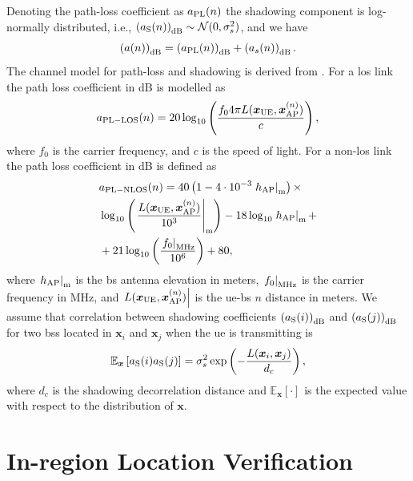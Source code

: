 \documentclass[conference,final]{IEEEtran}
\newcommand{\E}[2]{\mathbb{E}_{#1}\left[#2\right]}
\begin{document}
 Denoting the path-loss coefficient as $a_{\rm PL}{(n)}$  the shadowing component is log-normally distributed, i.e., $\left(a_{\rm S}{(n)}\right)_{\rm dB} \sim \mathcal{N}(0,\sigma_s^2)$, and we have
\begin{equation}
    \left(a{(n)}\right)_{\rm dB} = \left(a_{\rm PL}{(n)}\right)_{\rm dB} + \left(a_s{(n)}\right)_{\rm dB}.
\end{equation}
The channel model for path-loss and shadowing is derived from \cite{3gpp}. 
For a \ac{los} link the path loss coefficient in dB is modelled as
\begin{equation}\label{eq:los}
    a_{\rm PL-LOS}{(n)} = 20\log_{10}\left(\frac{f_0 4\pi L(\bm{x}_{\rm UE},\bm{x}_{\rm AP}^{(n)})}{c}\right),
\end{equation}
where $f_0$ is the carrier frequency, and $c$ is the speed of light. For a  non-\ac{los} link the path loss coefficient in dB is defined as
\begin{equation}
\begin{split}
    &a_{\rm PL-NLOS}{(n)} = 40\left(1-4 \cdot 10^{-3} \left. h_{\rm AP} \right|_{\rm m} \right)  \times  \\
    &\log_{10}\left (\left.\frac{L(\bm{x}_{\rm UE},\bm{x}_{\rm AP}^{(n)})}{10^3}\right|_{\rm m}\right ) -18\log_{10}\left.h_{\rm AP}\right|_{\rm m} +\\
    &
    + 21\log_{10}\left(\frac{\left.f_0\right|_{\rm MHz}}{10^6}\right) + 80,
    \end{split}
\end{equation}
where $\left.h_{\rm AP}\right|_{\rm m}$ is the \ac{bs} antenna elevation in meters, $\left. f_0 \right|_{\rm MHz}$ is the carrier frequency in MHz, and $\left. L(\bm{x}_{\rm UE},\bm{x}_{\rm AP}^{(n)})\right|$ is the \ac{ue}-\ac{bs} $n$ distance in meters.
We assume that correlation between shadowing coefficients $\left( a_{\rm S}(i)\right)_{\rm dB}$ and $\left( a_{\rm S}(j)\right)_{\rm dB}$ for two \acp{bs} located in $\bm{x}_i$ and $\bm{x}_j$ when the \ac{ue} is transmitting is
\begin{equation}\label{eq: coor mat}
    \E{\bm x}{a_{\rm S}(i)a_{\rm S}(j)} = \sigma_s^2\exp \left({-\frac{L(\bm{x}_i,\bm{x}_j)}{d_c}}\right),
\end{equation}
where $d_c$ is the shadowing decorrelation distance and $\E{\bm x}{\cdot}$ is the expected value with respect to the distribution of $\bm x$.


\section{In-region Location Verification}\label{sec: ml}
\end{document}
